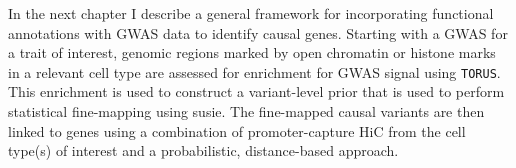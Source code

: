 In the next chapter I describe a general framework for incorporating functional annotations with GWAS data to identify causal genes.  Starting with a GWAS for a trait of interest, genomic regions marked by open chromatin or histone marks in a relevant cell type are assessed for enrichment for GWAS signal using \texttt{TORUS}\cite{torus}.  This enrichment is used to construct a variant-level prior that is used to perform statistical fine-mapping using susie\cite{susie}.  The fine-mapped causal variants are then linked to genes using a combination of promoter-capture HiC from the cell type(s) of interest and a probabilistic, distance-based approach.  






